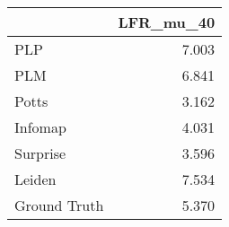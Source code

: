 \begin{tabular}{lr}
\toprule
{} & LFR_mu_40 \\
\midrule
PLP          &     7.003 \\
PLM          &     6.841 \\
Potts        &     3.162 \\
Infomap      &     4.031 \\
Surprise     &     3.596 \\
Leiden       &     7.534 \\
Ground Truth &     5.370 \\
\bottomrule
\end{tabular}
